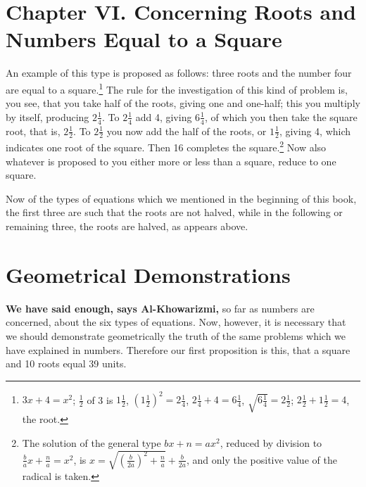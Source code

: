 \documentclass[11pt,a4paper]{book}
\begin{document}
\section*{Chapter VI. Concerning Roots and Numbers Equal to a Square}

An example of this type is proposed as follows: three roots and the number four are equal to a square.\footnote{$3x + 4 = x^2$; $\frac{1}{2}$ of 3 is $1\frac{1}{2}$, $(1\frac{1}{2})^2 = 2\frac{1}{4}$, $2\frac{1}{4} + 4 = 6\frac{1}{4}$, $\sqrt{6\frac{1}{4}} = 2\frac{1}{2}$; $2\frac{1}{2} + 1\frac{1}{2} = 4$, the root.} The rule for the investigation of this kind of problem is, you see, that you take half of the roots, giving one and one-half; this you multiply by itself, producing $2\frac{1}{4}$. To $2\frac{1}{4}$ add 4, giving $6\frac{1}{4}$, of which you then take the square root, that is, $2\frac{1}{2}$. To $2\frac{1}{2}$ you now add the half of the roots, or $1\frac{1}{2}$, giving 4, which indicates one root of the square. Then 16 completes the square.\footnote{The solution of the general type $bx + n = ax^2$, reduced by division to $\frac{b}{a}x + \frac{n}{a} = x^2$, is $x = \sqrt{(\frac{b}{2a})^2 + \frac{n}{a}} + \frac{b}{2a}$, and only the positive value of the radical is taken.} Now also whatever is proposed to you either more or less than a square, reduce to one square.

Now of the types of equations which we mentioned in the beginning of this book, the first three are such that the roots are not halved, while in the following or remaining three, the roots are halved, as appears above.

\section*{Geometrical Demonstrations}

\textbf{We have said enough, says Al-Khowarizmi,} so far as numbers are concerned, about the six types of equations. Now, however, it is necessary that we should demonstrate geometrically the truth of the same problems which we have explained in numbers. Therefore our first proposition is this, that a square and 10 roots equal 39 units.
\end{document}
